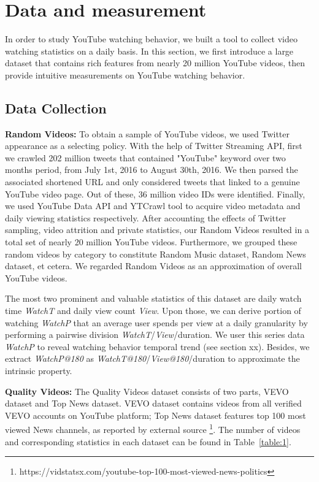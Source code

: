 \section{Data and measurement}

In order to study YouTube watching behavior, we built a tool to collect video watching statistics on a daily basis. In this section, we first introduce a large dataset that contains rich features from nearly 20 million YouTube videos, then provide intuitive measurements on YouTube watching behavior.

\subsection{Data Collection}

\noindent\textbf{Random Videos:} To obtain a sample of YouTube videos, we used Twitter appearance as a selecting policy. With the help of Twitter Streaming API, first we crawled 202 million tweets that contained "YouTube" keyword over two months period, from July 1st, 2016 to August 30th, 2016. We then parsed the associated shortened URL and only considered tweets that linked to a genuine YouTube video page. Out of these, 36 million video IDs were identified. Finally, we used YouTube Data API and YTCrawl tool \cite{yu:2015lifecyle} to acquire video metadata and daily viewing statistics respectively. After accounting the effects of Twitter sampling, video attrition and private statistics, our Random Videos resulted in a total set of nearly 20 million YouTube videos. Furthermore, we grouped these random videos by category to constitute Random Music dataset, Random News dataset, et cetera. We regarded Random Videos as an approximation of overall YouTube videos.

The most two prominent and valuable statistics of this dataset are daily watch time \textit{WatchT} and daily view count \textit{View}. Upon those, we can derive portion of watching \textit{WatchP} that an average user spends per view at a daily granularity by performing a pairwise division \textit{WatchT}/\textit{View}/duration. We user this series data \textit{WatchP} to reveal watching behavior temporal trend (see section xx). Besides, we extract \textit{WatchP@180} as \textit{WatchT@180}/\textit{View@180}/duration to approximate the intrinsic property.

\noindent\textbf{Quality Videos:} The Quality Videos dataset consists of two parts, VEVO dataset and Top News dataset. VEVO dataset contains videos from all verified VEVO accounts on YouTube platform; Top News dataset features top 100 most viewed News channels, as reported by external source \footnote{https://vidstatsx.com/youtube-top-100-most-viewed-news-politics}. The number of videos and corresponding statistics in each dataset can be found in Table~\ref{table:1}.

